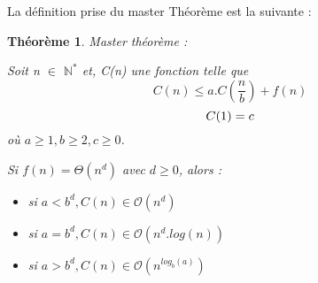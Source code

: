 \documentclass[a4paper,10pt]{article}
\newtheorem{thm}{Théorème}
\begin{document}
La définition prise du master Théorème est la suivante :
\begin{thm}
  Master théorème :


  Soit n $\in$ $\mathbb{N^*}$ et, C(n) une fonction telle que
\begin{equation}
    C(n) \leq a.C(\frac{n}{b})+f(n)
\end{equation}
\begin{equation}
    $$C(1)=c$$
\end{equation}
  où $a\geq 1, b \geq 2, c \geq 0$.

  Si $f(n) = \Theta (n^d)$ avec $d \geq 0$, alors :

  \begin{itemize}
  \item si $a<b^d, C(n) \in \mathcal{O}(n^d)$
  \item si $a=b^d, C(n) \in \mathcal{O}(n^d.log(n))$
  \item si $a>b^d, C(n) \in \mathcal{O}(n^{log_b(a)})$
  \end{itemize}
  
\end{thm}
\end{document}
